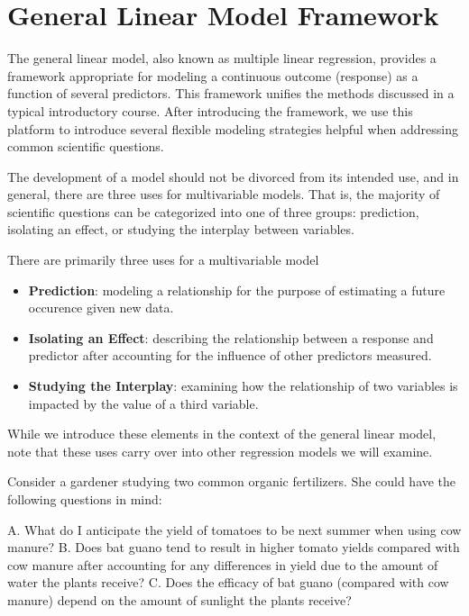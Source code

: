 \documentclass[
]{book}
\providecommand{\tightlist}{%
  \setlength{\itemsep}{0pt}\setlength{\parskip}{0pt}}
\theoremstyle{plain}
\theoremstyle{mydefn}
\theoremstyle{myexmpl}
\theoremstyle{remark}
\begin{document}
\hypertarget{glm-framework}{%
\chapter{General Linear Model Framework}\label{glm-framework}}

The general linear model, also known as multiple linear regression, provides a framework appropriate for modeling a continuous outcome (response) as a function of several predictors. This framework unifies the methods discussed in a typical introductory course. After introducing the framework, we use this platform to introduce several flexible modeling strategies helpful when addressing common scientific questions.

The development of a model should not be divorced from its intended use, and in general, there are three uses for multivariable models. That is, the majority of scientific questions can be categorized into one of three groups: prediction, isolating an effect, or studying the interplay between variables.

\begin{rmdkeyidea}
There are primarily three uses for a multivariable model

\begin{itemize}
\tightlist
\item
  \textbf{Prediction}: modeling a relationship for the purpose of estimating a future occurence given new data.
\item
  \textbf{Isolating an Effect}: describing the relationship between a response and predictor after accounting for the influence of other predictors measured.
\item
  \textbf{Studying the Interplay}: examining how the relationship of two variables is impacted by the value of a third variable.
\end{itemize}
\end{rmdkeyidea}

While we introduce these elements in the context of the general linear model, note that these uses carry over into other regression models we will examine.

Consider a gardener studying two common organic fertilizers. She could have the following questions in mind:

A. What do I anticipate the yield of tomatoes to be next summer when using cow manure?
B. Does bat guano tend to result in higher tomato yields compared with cow manure after accounting for any differences in yield due to the amount of water the plants receive?
C. Does the efficacy of bat guano (compared with cow manure) depend on the amount of sunlight the plants receive?
\end{document}
